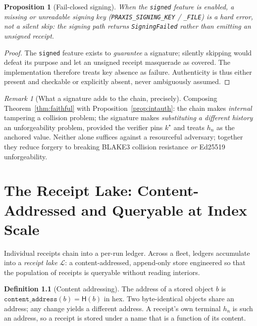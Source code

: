 \documentclass[11pt,oneside]{book}
\theoremstyle{definition}
\newtheorem{definition}{Definition}[chapter]
\theoremstyle{plain}
\newtheorem{proposition}[theorem]{Proposition}
\theoremstyle{remark}
\newtheorem*{remark}{Remark}
\newcommand{\chainH}{\mathsf{H}}               %
\newcommand{\code}[1]{\texttt{#1}}
\newcommand{\Lake}{\mathcal{L}}                 %
\begin{document}
\begin{proposition}[Fail-closed signing]\label{prop:failclosed}
When the \code{signed} feature is enabled, a missing or unreadable signing key
(\code{PRAXIS\_SIGNING\_KEY} / \code{\_FILE}) is a hard error, not a silent skip: the signing
path returns \code{SigningFailed} rather than emitting an unsigned receipt.
\end{proposition}

\begin{proof}
The \code{signed} feature exists to \emph{guarantee} a signature; silently skipping would
defeat its purpose and let an unsigned receipt masquerade as covered. The implementation
therefore treats key absence as failure. Authenticity is thus either present and checkable or
explicitly absent, never ambiguously assumed. \end{proof}

\begin{remark}[What a signature adds to the chain, precisely]
Composing Theorem~\ref{thm:faithful} with Proposition~\ref{prop:intauth}: the chain makes
\emph{internal} tampering a collision problem; the signature makes \emph{substituting a
different history} an unforgeability problem, provided the verifier pins $k^{\star}$ and treats
$h_n$ as the anchored value. Neither alone suffices against a resourceful adversary; together
they reduce forgery to breaking BLAKE3 collision resistance \emph{or} Ed25519 unforgeability.
\end{remark}

\chapter{The Receipt Lake: Content-Addressed and Queryable at Index Scale}
\label{ch:lake}

Individual receipts chain into a per-run ledger. Across a fleet, ledgers accumulate into a
\emph{receipt lake} $\Lake$: a content-addressed, append-only store engineered so that the
population of receipts is queryable without reading interiors.

\begin{definition}[Content addressing]\label{def:contentaddr}
The address of a stored object $b$ is $\code{content\_address}(b)=\chainH(b)$ in hex. Two
byte-identical objects share an address; any change yields a different address. A receipt's
own terminal $h_n$ is such an address, so a receipt is stored under a name that is a function
of its content.
\end{definition}
\end{document}
